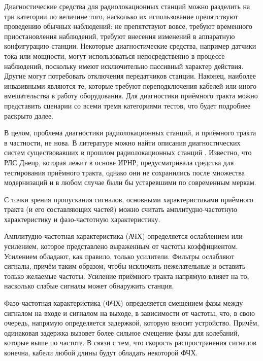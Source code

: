\documentclass{report}
\begin{document}
Диагностические средства для радиолокационных станций можно разделить на три категории по величине того, насколько их использование препятствуют проведению обычных наблюдений: не препятствуют вовсе, требуют временного приостановления наблюдений, требуют внесения изменений в аппаратную конфигурацию станции. Некоторые диагностические средства, например датчики тока или мощности, могут использоваться непосредственно в процессе наблюдений, поскольку имеют исключительно пассивный характер действия. Другие могут потребовать отключения передатчиков станции. Наконец, наиболее инвазивными являются те, которые требуют переподключения кабелей или иного вмешательства в работу оборудования. Для диагностики приёмного тракта можно представить сценарии со всеми тремя категориями тестов, что будет подробнее раскрыто далее.

В целом, проблема диагностики радиолокационных станций, и приёмного тракта в частности, не нова. В литературе можно найти описания диагностических систем существовавших в прошлом радиолокационных станций \cite{abm}. Известно, что РЛС Днепр, которая лежит в основе ИРНР, предусматривала средства для тестирования приёмного тракта, однако они не сохранились после множества модернизаций и в любом случае были бы устаревшими по современным меркам.

С точки зрения пропускания сигналов, основными характеристиками  приёмного тракта (и его составляющих частей) можно считать амплитудно-частотную характеристику и фазо-частотную характеристику.

Амплитудно-частотная характеристика (АЧХ) определяется ослаблением или усилением, которое представлено выраженным от частоты коэффициентом. Усилением обладают, как правило, только усилители. Фильтры ослабляют сигналы, причём таким образом, чтобы исключить нежелательные и оставить только желаемые частоты. Усиление приёмного тракта напрямую влияет на то, насколько слабые сигналы может обнаружить станция.

Фазо-частотная характеристика (ФЧХ) определяется смещением фазы между сигналом на входе и сигналом на выходе, в зависимости от частоты, что, в свою очередь, напрямую определяется задержкой, которую вносит устройство. Причём, одинаковая задержка вызовет более сильное смещение фазы для колебаний, которые выше по частоте. В связи с тем, что скорость распространения сигналов конечна, кабели любой длины будут обладать некоторой ФЧХ.
\end{document}
